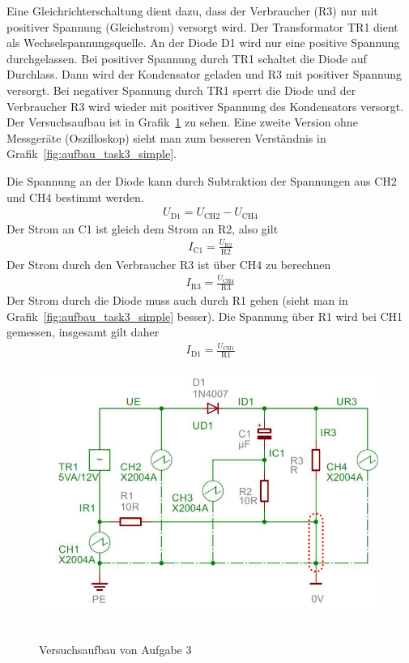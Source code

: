 \documentclass{article}
\begin{document}
Eine Gleichrichterschaltung dient dazu, dass der Verbraucher (R3) nur mit positiver Spannung (Gleichstrom) versorgt wird. Der Transformator TR1 dient als Wechselspannungsquelle. An der Diode D1 wird nur eine positive Spannung durchgelassen. Bei positiver Spannung durch TR1 schaltet die Diode auf Durchlass. Dann wird der Kondensator geladen und R3 mit positiver Spannung versorgt. Bei negativer Spannung durch TR1 sperrt die Diode und der Verbraucher R3 wird wieder mit positiver Spannung des Kondensators versorgt. Der Versuchsaufbau ist in Grafik~\ref{fig:aufbau_task3} zu sehen. Eine zweite Version ohne Messgeräte (Oszilloskop) sieht man zum besseren Verständnis in Grafik~\ref{fig:aufbau_task3_simple}.



Die Spannung an der Diode kann durch Subtraktion der Spannungen aus CH2 und CH4 bestimmt werden.
\begin{align}
\label{eq:UD1}
U_{\text{D1}} = U_{\text{CH2}} - U_{\text{CH4}}
\end{align}
Der Strom an C1 ist gleich dem Strom an R2, also gilt
\begin{align}
\label{eq:IC1}
I_{\text{C1}} = \frac{U_{\text{R2}}}{\text{R2}}
\end{align}
Der Strom durch den Verbraucher R3 ist über CH4 zu berechnen
\begin{align}
\label{eq:IR3}
I_{\text{R3}} = \frac{U_{\text{CH4}}}{\text{R3}}
\end{align}
Der Strom durch die Diode muss auch durch R1 gehen (sieht man in Grafik~\ref{fig:aufbau_task3_simple} besser). Die Spannung über R1 wird bei CH1 gemessen, insgesamt gilt daher
\begin{align}
\label{eq:ID1}
I_{\text{D1}} = \frac{U_{\text{CH1}}}{\text{R1}}
\end{align}

\begin{figure}[H]
\caption{Versuchsaufbau von Aufgabe 3}
\label{fig:aufbau_task3}
{\centering
\includegraphics[scale=1.7]{bilder/aufbau_task3.png}
~
}
\end{figure}
\end{document}
